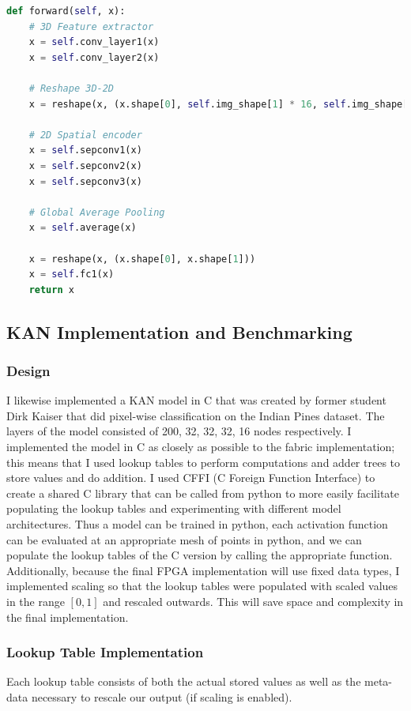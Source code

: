 \documentclass{article}
\begin{document}
\begin{lstlisting}[language=python]
def forward(self, x):
    # 3D Feature extractor
    x = self.conv_layer1(x)
    x = self.conv_layer2(x)

    # Reshape 3D-2D
    x = reshape(x, (x.shape[0], self.img_shape[1] * 16, self.img_shape[2], self.img_shape[3]))

    # 2D Spatial encoder
    x = self.sepconv1(x)
    x = self.sepconv2(x)
    x = self.sepconv3(x)

    # Global Average Pooling
    x = self.average(x)

    x = reshape(x, (x.shape[0], x.shape[1]))
    x = self.fc1(x)
    return x

\end{lstlisting}

\subsection{KAN Implementation and Benchmarking}

\subsubsection{Design}
I likewise implemented a KAN model in C that was created by former student Dirk Kaiser that did pixel-wise classification on the Indian Pines dataset. The layers of the model consisted of 200, 32, 32, 32, 16 nodes respectively. I implemented the model in C as closely as possible to the fabric implementation; this means that I used lookup tables to perform computations and adder trees to store values and do addition. I used CFFI (C Foreign Function Interface) to create a shared C library that can be called from python to more easily facilitate populating the lookup tables and experimenting with different model architectures. Thus a model can be trained in python, each activation function can be evaluated at an appropriate mesh of points in python, and we can populate the lookup tables of the C version by calling the appropriate function. Additionally, because the final FPGA implementation will use fixed data types, I implemented scaling so that the lookup tables were populated with scaled values in the range $[0,1]$ and rescaled outwards. This will save space and complexity in the final implementation. 

\subsubsection{Lookup Table Implementation}
Each lookup table consists of both the actual stored values as well as the meta-data necessary to rescale our output (if scaling is enabled).
\end{document}
